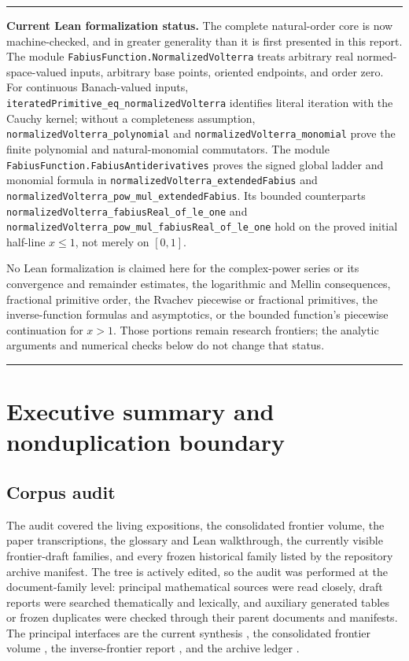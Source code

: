 \documentclass[11pt,oneside]{article}
\numberwithin{equation}{section}
\theoremstyle{definition}
\theoremstyle{remark}
\newcommand{\decl}[1]{\nolinkurl{#1}}
\newenvironment{boxedremark}{%
  \par\smallskip\noindent\begin{center}\begin{minipage}{0.94\textwidth}%
  \color{black}\hrule\vspace{0.6em}\small
}{%
  \vspace{0.6em}\hrule\end{minipage}\end{center}\smallskip
}
\begin{document}
\begin{boxedremark}
\textbf{Current Lean formalization status.}
The complete natural-order core is now machine-checked, and in greater
generality than it is first presented in this report.  The module
\decl{FabiusFunction.NormalizedVolterra} treats arbitrary real
normed-space-valued inputs, arbitrary base points, oriented endpoints, and
order zero.  For continuous Banach-valued inputs,
\decl{iteratedPrimitive_eq_normalizedVolterra} identifies literal iteration
with the Cauchy kernel; without a completeness assumption,
\decl{normalizedVolterra_polynomial} and
\decl{normalizedVolterra_monomial} prove the finite polynomial and
natural-monomial commutators.  The
module \decl{FabiusFunction.FabiusAntiderivatives} proves the signed global
ladder and monomial formula in
\decl{normalizedVolterra_extendedFabius} and
\decl{normalizedVolterra_pow_mul_extendedFabius}.  Its bounded counterparts
\decl{normalizedVolterra_fabiusReal_of_le_one} and
\decl{normalizedVolterra_pow_mul_fabiusReal_of_le_one} hold on the proved
initial half-line $x\le1$, not merely on $[0,1]$.

No Lean formalization is claimed here for the complex-power series or its
convergence and remainder estimates, the logarithmic and Mellin consequences,
fractional primitive order, the Rvachev piecewise or fractional primitives,
the inverse-function formulas and asymptotics, or the bounded function's
piecewise continuation for $x>1$.  Those portions remain research frontiers;
the analytic arguments and numerical checks below do not change that status.
\end{boxedremark}

\tableofcontents
\newpage

\section{Executive summary and nonduplication boundary}
\label{sec:executive}

\subsection{Corpus audit}
The audit covered the living expositions, the consolidated frontier volume, the
paper transcriptions, the glossary and Lean walkthrough, the currently visible
frontier-draft families, and every frozen historical family listed by the
repository archive manifest.  The tree is actively edited, so the audit was
performed at the document-family level: principal mathematical sources were
read closely, draft reports were searched thematically and lexically, and
auxiliary generated tables or frozen duplicates were checked through their
parent documents and manifests.  The principal interfaces are the current
synthesis \cite{ProveItPrimary}, the consolidated frontier volume
\cite{ProveItFrontiers}, the inverse-frontier report \cite{ProveItInverse}, and
the archive ledger \cite{ProveItArchive}.
\end{document}
